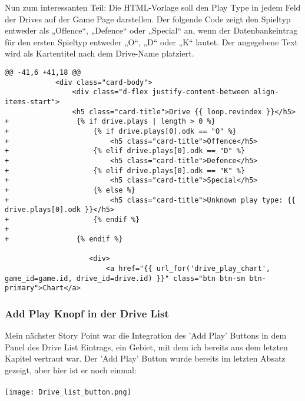 Nun zum interessanten Teil: Die HTML-Vorlage soll den Play Type in jedem Feld der Drives auf der Game Page darstellen. Der folgende Code zeigt den Spieltyp entweder als „Offence“, „Defence“ oder „Special“ an, wenn der Datenbankeintrag für den ersten Spieltyp entweder „O“, „D“ oder „K“ lautet. Der angegebene Text wird als Kartentitel nach dem Drive-Name platziert.

\begin{verbatim}
@@ -41,6 +41,18 @@
			<div class="card-body">
				<div class="d-flex justify-content-between align-items-start">
				<h5 class="card-title">Drive {{ loop.revindex }}</h5>
+                {% if drive.plays | length > 0 %}
+                    {% if drive.plays[0].odk == "O" %}
+                        <h5 class="card-title">Offence</h5>
+                    {% elif drive.plays[0].odk == "D" %}
+                        <h5 class="card-title">Defence</h5>
+                    {% elif drive.plays[0].odk == "K" %}
+                        <h5 class="card-title">Special</h5>
+                    {% else %}
+                        <h5 class="card-title">Unknown play type: {{ drive.plays[0].odk }}</h5>
+                    {% endif %}
+
+                {% endif %}

					<div>
						<a href="{{ url_for('drive_play_chart', game_id=game.id, drive_id=drive.id) }}" class="btn btn-sm btn-primary">Chart</a>	
\end{verbatim}

\subsubsection{Add Play Knopf in der Drive List}
Mein nächster Story Point war die Integration des 'Add Play' Buttons in dem Panel des Drive List Eintrags, ein Gebiet, mit dem ich bereits aus dem letzten Kapitel vertraut war. Der 'Add Play' Button wurde bereits im letzten Absatz gezeigt, aber hier ist er noch einmal:
\\ \\
\texttt{[image: Drive\_list\_button.png]} \\

